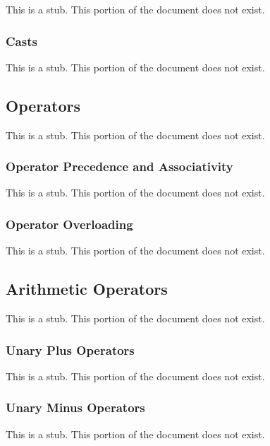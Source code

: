 This is a stub.  This portion of the document does not exist.

\subsubsection{Casts}
\label{Casts}

This is a stub.  This portion of the document does not exist.

\subsection{Operators}
\label{Operators}

This is a stub.  This portion of the document does not exist.

\subsubsection{Operator Precedence and Associativity}
\label{Operator_Precedence_and_Associativity}

This is a stub.  This portion of the document does not exist.

\subsubsection{Operator Overloading}
\label{Operator_Overloading}

This is a stub.  This portion of the document does not exist.

\subsection{Arithmetic Operators}
\label{Arithmetic_Operators}

This is a stub.  This portion of the document does not exist.

\subsubsection{Unary Plus Operators}
\label{Unary_Plus_Operators}

This is a stub.  This portion of the document does not exist.

\subsubsection{Unary Minus Operators}
\label{Unary_Minus_Operators}

This is a stub.  This portion of the document does not exist.

